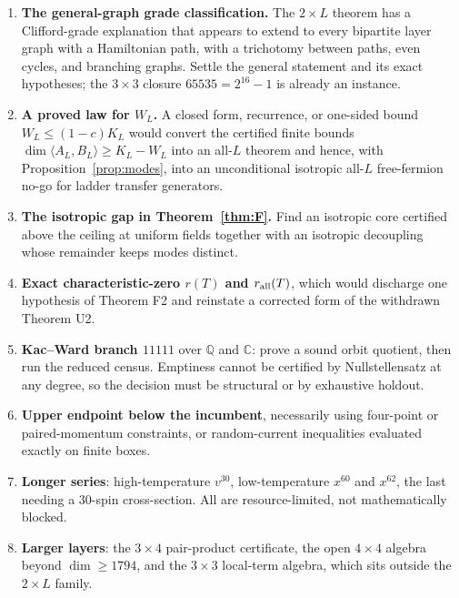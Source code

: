 \documentclass[11pt]{article}
\theoremstyle{definition}
\newcommand{\Qb}{\mathbb{Q}}
\newcommand{\Cb}{\mathbb{C}}
\begin{document}
\begin{enumerate}[leftmargin=*,itemsep=2pt]
\item \textbf{The general-graph grade classification.} The $2\times L$ theorem has a Clifford-grade
      explanation that appears to extend to every bipartite layer graph with a Hamiltonian path, with
      a trichotomy between paths, even cycles, and branching graphs. Settle the general statement and
      its exact hypotheses; the $3\times3$ closure $65535=2^{16}-1$ is already an instance.
\item \textbf{A proved law for $W_L$.} A closed form, recurrence, or one-sided bound
      $W_L\le(1-c)K_L$ would convert the certified finite bounds
      $\dim\langle A_L,B_L\rangle\ge K_L-W_L$ into an all-$L$ theorem and hence, with
      Proposition~\ref{prop:modes}, into an unconditional isotropic all-$L$ free-fermion no-go for
      ladder transfer generators.
\item \textbf{The isotropic gap in Theorem~\ref{thm:F}.} Find an isotropic core certified above the
      ceiling at uniform fields together with an isotropic decoupling whose remainder keeps modes
      distinct.
\item \textbf{Exact characteristic-zero $r(T)$ and $r_{\rm all}(T)$}, which would discharge one
      hypothesis of Theorem F2 and reinstate a corrected form of the withdrawn Theorem U2.
\item \textbf{Kac--Ward branch $11111$} over $\Qb$ and $\Cb$: prove a sound orbit quotient, then run
      the reduced census. Emptiness cannot be certified by Nullstellensatz at any degree, so the
      decision must be structural or by exhaustive holdout.
\item \textbf{Upper endpoint below the incumbent}, necessarily using four-point or paired-momentum
      constraints, or random-current inequalities evaluated exactly on finite boxes.
\item \textbf{Longer series}: high-temperature $v^{30}$, low-temperature $x^{60}$ and $x^{62}$, the
      last needing a $30$-spin cross-section. All are resource-limited, not mathematically blocked.
\item \textbf{Larger layers}: the $3\times4$ pair-product certificate, the open $4\times4$ algebra
      beyond $\dim\ge1794$, and the $3\times3$ local-term algebra, which sits outside the $2\times L$
      family.
\end{enumerate}
\end{document}
